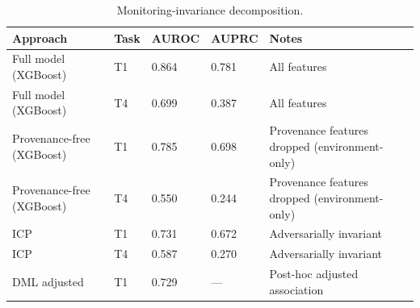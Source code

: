 \begin{table}
\caption{Monitoring-invariance decomposition.}
\label{tab:monitoring_invariance}
\begin{tabular}{lllll}
\toprule
Approach & Task & AUROC & AUPRC & Notes \\
\midrule
Full model (XGBoost) & T1 & 0.864 & 0.781 & All features \\
Full model (XGBoost) & T4 & 0.699 & 0.387 & All features \\
Provenance-free (XGBoost) & T1 & 0.785 & 0.698 & Provenance features dropped (environment-only) \\
Provenance-free (XGBoost) & T4 & 0.550 & 0.244 & Provenance features dropped (environment-only) \\
ICP & T1 & 0.731 & 0.672 & Adversarially invariant \\
ICP & T4 & 0.587 & 0.270 & Adversarially invariant \\
DML adjusted & T1 & 0.729 & — & Post-hoc adjusted association \\
\bottomrule
\end{tabular}
\end{table}
